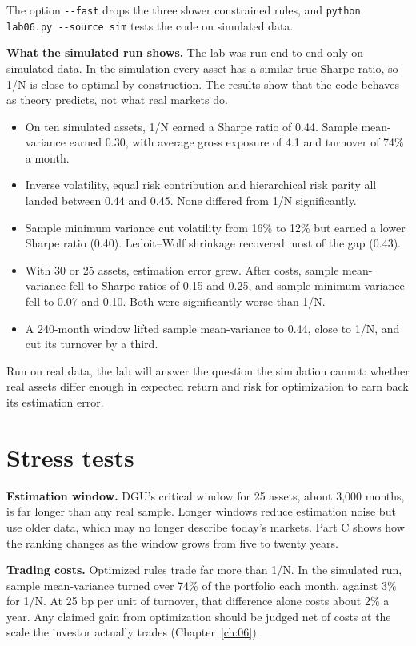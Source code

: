 {\sloppy The option \texttt{-{}-fast} drops the three slower constrained rules, and \texttt{python lab06.py -{}-source sim} tests the code on simulated data.\par}

\textbf{What the simulated run shows.} The lab was run end to end only on simulated data. In the simulation every asset has a similar true Sharpe ratio, so 1/N is close to optimal by construction. The results show that the code behaves as theory predicts, not what real markets do.

\begin{itemize}
  \item On ten simulated assets, 1/N earned a Sharpe ratio of 0.44. Sample mean-variance earned 0.30, with average gross exposure of 4.1 and turnover of 74\% a month.
  \item Inverse volatility, equal risk contribution and hierarchical risk parity all landed between 0.44 and 0.45. None differed from 1/N significantly.
  \item Sample minimum variance cut volatility from 16\% to 12\% but earned a lower Sharpe ratio (0.40). Ledoit--Wolf shrinkage recovered most of the gap (0.43).
  \item With 30 or 25 assets, estimation error grew. After costs, sample mean-variance fell to Sharpe ratios of 0.15 and 0.25, and sample minimum variance fell to 0.07 and 0.10. Both were significantly worse than 1/N.
  \item A 240-month window lifted sample mean-variance to 0.44, close to 1/N, and cut its turnover by a third.
\end{itemize}

Run on real data, the lab will answer the question the simulation cannot: whether real assets differ enough in expected return and risk for optimization to earn back its estimation error.

\section{Stress tests}
\label{sec:19-stress}

\textbf{Estimation window.} DGU's critical window for 25 assets, about 3,000 months, is far longer than any real sample. Longer windows reduce estimation noise but use older data, which may no longer describe today's markets. Part C shows how the ranking changes as the window grows from five to twenty years.

\textbf{Trading costs.} Optimized rules trade far more than 1/N. In the simulated run, sample mean-variance turned over 74\% of the portfolio each month, against 3\% for 1/N. At 25 bp per unit of turnover, that difference alone costs about 2\% a year. Any claimed gain from optimization should be judged net of costs at the scale the investor actually trades (Chapter~\ref{ch:06}).


